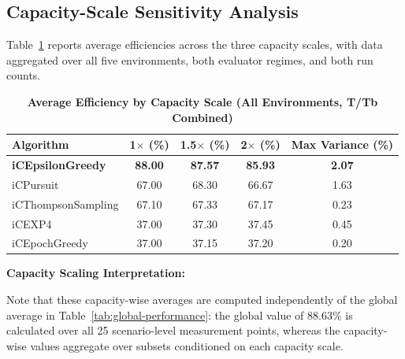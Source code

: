 \documentclass[12pt,a4paper]{article}
\newcommand{\performance}[1]{\textcolor{performancecolor}{\textbf{#1}}}
\begin{document}
\begin{tcolorbox}[colback=stochasticcolor!10,colframe=stochasticcolor,title=\textbf{Environment-Wise Performance Analysis}]
\end{tcolorbox}

\subsection{Capacity-Scale Sensitivity Analysis}

Table~\ref{tab:capacity-analysis} reports average efficiencies across the three capacity scales, with data aggregated over all five environments, both evaluator regimes, and both run counts.

\begin{table}[H]
\centering
\caption{\performance{Average Efficiency by Capacity Scale (All Environments, T/Tb Combined)}}
\label{tab:capacity-analysis}
\begin{tabular}{|l|c|c|c|c|}
\hline
\textbf{Algorithm} & \textbf{1$\times$ (\%)} & \textbf{1.5$\times$ (\%)} & \textbf{2$\times$ (\%)} & \textbf{Max Variance (\%)} \\
\hline
\hline
\performance{iCEpsilonGreedy}   & \performance{88.00} & \performance{87.57} & \performance{85.93} & \performance{2.07} \\
iCPursuit                       & 67.00 & 68.30 & 66.67 & 1.63 \\
iCThompsonSampling              & 67.10 & 67.33 & 67.17 & 0.23 \\
iCEXP4                          & 37.00 & 37.30 & 37.45 & 0.45 \\
iCEpochGreedy                   & 37.00 & 37.15 & 37.20 & 0.20 \\
\hline
\end{tabular}
\end{table}

\textbf{Capacity Scaling Interpretation:}

Note that these capacity-wise averages are computed independently of the global average in Table~\ref{tab:global-performance}: the global value of 88.63\% is calculated over all 25 scenario-level measurement points, whereas the capacity-wise values aggregate over subsets conditioned on each capacity scale.
\end{document}
